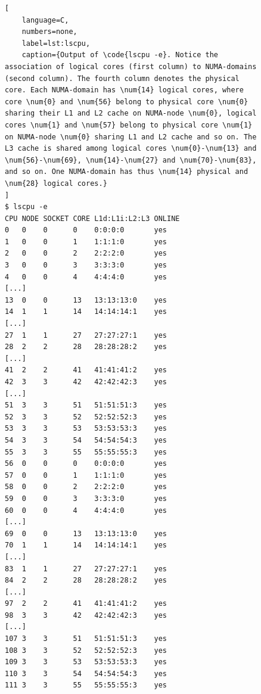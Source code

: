 \documentclass{article}
\theoremstyle{plain} %
\theoremstyle{convention} %
\theoremstyle{remark} %
\def\code#1{\texttt{#1}}
\numberwithin{equation}{section}
\begin{document}
\begin{figure}
\begin{lstlisting}[
    language=C,
    numbers=none,
    label=lst:lscpu,
    caption={Output of \code{lscpu -e}. Notice the association of logical cores (first column) to NUMA-domains (second column). The fourth column denotes the physical core. Each NUMA-domain has \num{14} logical cores, where core \num{0} and \num{56} belong to physical core \num{0} sharing their L1 and L2 cache on NUMA-node \num{0}, logical cores \num{1} and \num{57} belong to physical core \num{1} on NUMA-node \num{0} sharing L1 and L2 cache and so on. The L3 cache is shared among logical cores \num{0}-\num{13} and \num{56}-\num{69}, \num{14}-\num{27} and \num{70}-\num{83}, and so on. One NUMA-domain has thus \num{14} physical and \num{28} logical cores.}
]
$ lscpu -e
CPU NODE SOCKET CORE L1d:L1i:L2:L3 ONLINE
0   0    0      0    0:0:0:0       yes
1   0    0      1    1:1:1:0       yes
2   0    0      2    2:2:2:0       yes
3   0    0      3    3:3:3:0       yes
4   0    0      4    4:4:4:0       yes
[...]
13  0    0      13   13:13:13:0    yes
14  1    1      14   14:14:14:1    yes
[...]
27  1    1      27   27:27:27:1    yes
28  2    2      28   28:28:28:2    yes
[...]
41  2    2      41   41:41:41:2    yes
42  3    3      42   42:42:42:3    yes
[...]
51  3    3      51   51:51:51:3    yes
52  3    3      52   52:52:52:3    yes
53  3    3      53   53:53:53:3    yes
54  3    3      54   54:54:54:3    yes
55  3    3      55   55:55:55:3    yes
56  0    0      0    0:0:0:0       yes
57  0    0      1    1:1:1:0       yes
58  0    0      2    2:2:2:0       yes
59  0    0      3    3:3:3:0       yes
60  0    0      4    4:4:4:0       yes
[...]
69  0    0      13   13:13:13:0    yes
70  1    1      14   14:14:14:1    yes
[...]
83  1    1      27   27:27:27:1    yes
84  2    2      28   28:28:28:2    yes
[...]
97  2    2      41   41:41:41:2    yes
98  3    3      42   42:42:42:3    yes
[...]
107 3    3      51   51:51:51:3    yes
108 3    3      52   52:52:52:3    yes
109 3    3      53   53:53:53:3    yes
110 3    3      54   54:54:54:3    yes
111 3    3      55   55:55:55:3    yes
\end{lstlisting}
\end{figure}
\end{document}
